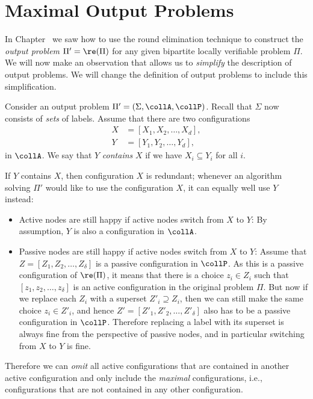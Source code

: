 \section{Maximal Output Problems}\label{sec:re-maximal}

In Chapter~ we saw how to use the round elimination technique to construct the \emph{output problem} $\Pi' = \re(\Pi)$ for any given bipartite locally verifiable problem $\Pi$. We will now make an observation that allows us to \emph{simplify} the description of output problems. We will change the definition of output problems to include this simplification.

Consider an output problem $\Pi' = (\Sigma, \collA, \collP)$. Recall that $\Sigma$ now consists of \emph{sets} of labels. Assume that there are two configurations
\begin{align*}
X &= [X_1, X_2, \dotsc, X_d], \\
Y &= [Y_1, Y_2, \dotsc, Y_d],
\end{align*}
in $\collA$. We say that $Y$ \emph{contains} $X$ if we have $X_i \subseteq Y_i$ for all $i$.

If $Y$ contains $X$, then configuration $X$ is redundant; whenever an algorithm solving $\Pi'$ would like to use the configuration $X$, it can equally well use $Y$ instead:
\begin{itemize}
	\item Active nodes are still happy if active nodes switch from $X$ to $Y$: By assumption, $Y$ is also a configuration in $\collA$.
	\item Passive nodes are still happy if active nodes switch from $X$ to $Y$: Assume that $Z = [Z_1, Z_2, \dotsc, Z_\delta]$ is a passive configuration in $\collP$. As this is a passive configuration of $\re(\Pi)$, it means that there is a choice $z_i \in Z_i$ such that $[z_1, z_2, \dotsc, z_\delta]$ is an active configuration in the original problem $\Pi$. But now if we replace each $Z_i$ with a superset $Z'_i \supseteq Z_i$, then we can still make the same choice $z_i \in Z'_i$, and hence $Z' = [Z'_1, Z'_2, \dotsc, Z'_\delta]$ also has to be a passive configuration in $\collP$. Therefore replacing a label with its superset is always fine from the perspective of passive nodes, and in particular switching from $X$ to $Y$ is fine.
\end{itemize}
Therefore we can \emph{omit} all active configurations that are contained in another active configuration and only include the \emph{maximal} configurations, i.e., configurations that are not contained in any other configuration.

